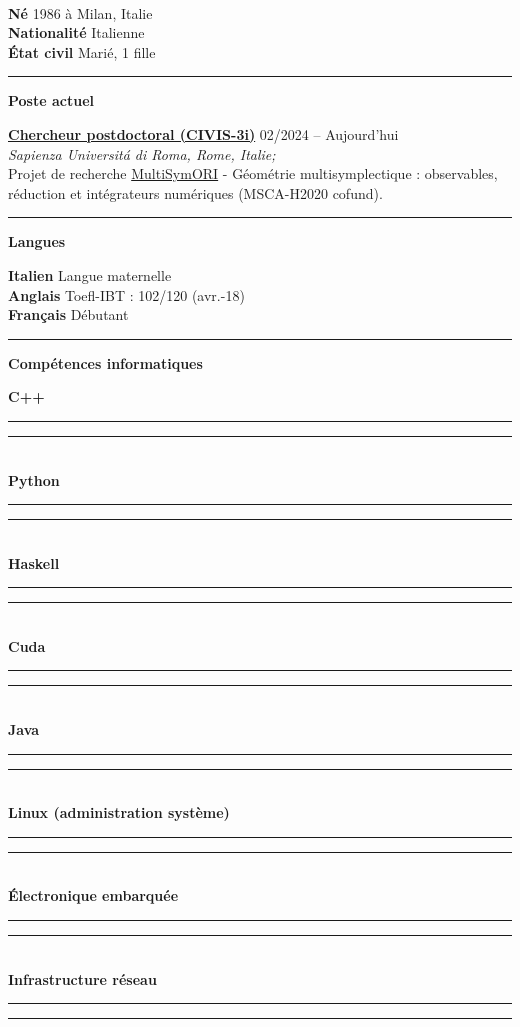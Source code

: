 \documentclass[a4paper]{article}
\newcommand{\crule}[3][black]{\textcolor{#1}{\rule{#2}{#3}}}
\newcommand{\progbar}[4][black]{\crule[#1]{#3}{#4}\crule[#1!10!white!90]{#2}{#4}}
\newcommand{\block}[1]{\hrule \vspace{0.2cm} \textbf{\Large #1} \vspace{0.2cm}}
\newcommand{\voice}[5]{\href{#4}{\textbf{#1}} \hfill #2 \\ \textit{#3} \\ {\small #5} \vspace{0.2cm} \\}
\newcommand{\skill}[2]{\textbf{#1} \hfill #2 \\}
\newcommand{\skillbar}[4]{\textbf{#1} \hfill \progbar{#2}{#3}{#4} \\}
\begin{document}
	\vfill

	\tableofcontents

	\vfill

	\clearpage

	\begin{minipage}[c]{0.6\columnwidth}
		\\
	\end{minipage}
	\hfill
	\begin{minipage}[t]{0.37\columnwidth}
		\skill{Né}{1986 à Milan, Italie}
		\skill{Nationalité}{Italienne}
		\skill{État civil}{Marié, 1 fille}
	\end{minipage}
	\vspace{-0.25em}

	\begin{minipage}[t]{0.6\columnwidth}

		\block{Poste actuel}

		\voice{Chercheur postdoctoral (CIVIS-3i)}
			{02/2024 -- Aujourd'hui}
			{Sapienza Universit\'a di Roma, Rome, Italie;}
			{https://civis3i.univ-amu.fr/en/civis3i-alliance-programme}
			{Projet de recherche \href{https://civis3i.univ-amu.fr/en/antonio-michele-miti}{MultiSymORI} - Géométrie multisymplectique : observables, réduction et intégrateurs numériques (MSCA-H2020 cofund).\vspace{-0.25cm}}

	\end{minipage}
	\hfill
	\begin{minipage}[t]{0.375\columnwidth}

		\block{Langues}

		\skill{Italien}{Langue maternelle}
		\skill{Anglais}{Toefl-IBT : 102/120 (avr.-18)}
		\skill{Français}{Débutant}

		\block{Compétences informatiques}

		\skillbar{C++}
			{1.4cm}
			{0.6cm}
			{0.25cm}
		\skillbar{Python}
			{1.1cm}
			{0.9cm}
			{0.25cm}
		\skillbar{Haskell}
			{1.5cm}
			{0.5cm}
			{0.25cm}
		\skillbar{Cuda}
			{1.1cm}
			{0.9cm}
			{0.25cm}
		\skillbar{Java}
			{1.2cm}
			{0.8cm}
			{0.25cm}
		\skillbar{Linux (administration système)}
			{0.7cm}
			{1.3cm}
			{0.25cm}
		\skillbar{Électronique embarquée}
			{1.5cm}
			{0.5cm}
			{0.25cm}
		\skillbar{Infrastructure réseau}
			{1.6cm}
			{0.4cm}
			{0.25cm}
	\end{minipage}
\end{document}
